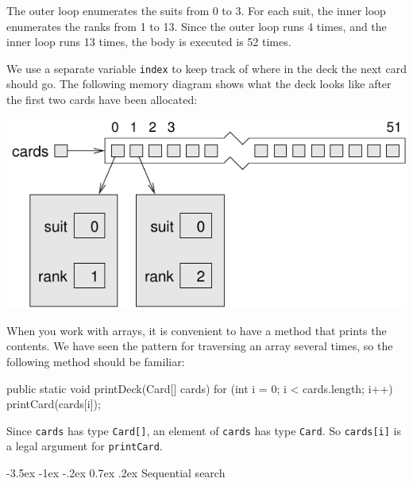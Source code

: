 \documentclass[12pt]{book}
\makeatletter
\theoremstyle{exercise}
\newcommand{\java}[1]{\verb"#1"}
\renewcommand{\section}{\@startsection{section}{1}{\z@}%
    {-3.5ex \@plus -1ex \@minus -.2ex}%
    {0.7ex \@plus.2ex}%
    {\normalfont\Large\bfseries}}
\newcommand{\java}[1]{\lstinline{#1}} %
\makeatother
\begin{document}
The outer loop enumerates the suits from 0 to 3.
For each suit, the inner loop enumerates the ranks from 1 to 13.
Since the outer loop runs 4 times, and the inner loop runs 13 times, the body is executed is 52 times.


We use a separate variable \java{index} to keep track of where in the deck the next card should go.
The following memory diagram shows what the deck looks like after the first two cards have been allocated:

\begin{center}
\includegraphics{figs/cardarray2.pdf}
\end{center}


\label{printdeck}


When you work with arrays, it is convenient to have a method that prints the contents.
We have seen the pattern for traversing an array several times, so the following method should be familiar:

\begin{code}
    public static void printDeck(Card[] cards) {
        for (int i = 0; i < cards.length; i++) {
            printCard(cards[i]);
        }
    }
\end{code}

Since \java{cards} has type \java{Card[]}, an element of \java{cards} has type \java{Card}.
So \java{cards[i]} is a legal argument for \java{printCard}.


\section{Sequential search}
\label{findcard}
\end{document}
